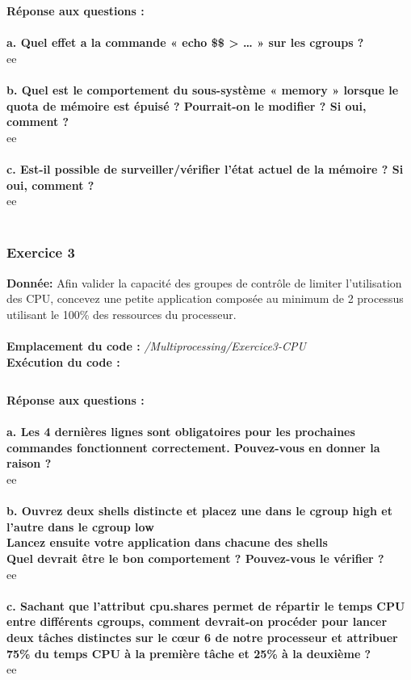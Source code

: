 \textbf{Réponse aux questions :}\\\\
\textbf{a. Quel	effet	a	la	commande	 « echo \$\$ > … »	sur	les	cgroups ?}\\
ee\\\\
\textbf{b. Quel	est	le	comportement	du	sous-système	« memory »	lorsque	le	quota	de	mémoire	est	
	épuisé ?	Pourrait-on	le	modifier ?	Si	oui,	comment ?}\\
ee\\\\
\textbf{c. Est-il	possible	de	surveiller/vérifier l’état	actuel	de	la	mémoire ?	Si	oui,	comment ?}\\
ee\\\\

\subsubsection{Exercice 3}
\textbf{Donnée:} Afin	valider	la	capacité	des	groupes	de	contrôle	de	limiter	l’utilisation	des	CPU,	concevez	une	petite	application	composée	au	minimum	de	2	processus	utilisant	le	100\%	des	ressources	du	processeur.	\\\\

\textbf{Emplacement du code : } \textit{/Multiprocessing/Exercice3-CPU}\\

\textbf{Exécution du code : } \\
\begin{lstlisting}

\end{lstlisting}

\textbf{Réponse aux questions :}\\\\
\textbf{a. Les	4	dernières	lignes	sont	obligatoires	pour	les	prochaines	commandes	fonctionnent	
	correctement. Pouvez-vous	en	donner	la	raison ?}\\
ee\\\\
\textbf{b. Ouvrez	deux	shells	distincte	et	placez	une	dans	le	cgroup	high	et	l’autre	dans	le	cgroup	low\\	
	Lancez	ensuite	votre	application	dans	chacune	des	shells\\
	Quel	devrait	être	le	bon	comportement ?	Pouvez-vous	le	vérifier ?}\\
ee\\\\
\textbf{c. Sachant	que	l’attribut	cpu.shares permet	de	répartir	le	temps	CPU	entre	différents	
	cgroups,	comment devrait-on	procéder	pour	lancer deux	tâches	distinctes	sur	le	cœur	6	de	
	notre	processeur	et	attribuer	75\%	du	temps	CPU	à	la	première	tâche	et	25\%	à	la	deuxième ?}\\
ee\\\\